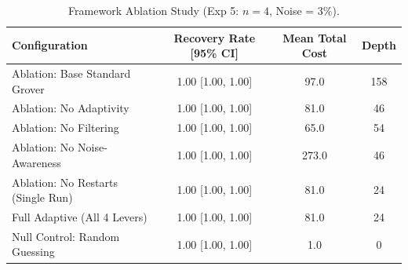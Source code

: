 \begin{table}[htbp]
\centering
\caption{Framework Ablation Study (Exp 5: $n=4$, Noise = 3\%).}
\label{tab:exp5_ablation}
\begin{tabular}{lccc}
\hline
\textbf{Configuration} & \textbf{Recovery Rate [95\% CI]} & \textbf{Mean Total Cost} & \textbf{Depth} \\
\hline
Ablation: Base Standard Grover & 1.00 [1.00, 1.00] & 97.0 & 158 \\
Ablation: No Adaptivity & 1.00 [1.00, 1.00] & 81.0 & 46 \\
Ablation: No Filtering & 1.00 [1.00, 1.00] & 65.0 & 54 \\
Ablation: No Noise-Awareness & 1.00 [1.00, 1.00] & 273.0 & 46 \\
Ablation: No Restarts (Single Run) & 1.00 [1.00, 1.00] & 81.0 & 24 \\
Full Adaptive (All 4 Levers) & 1.00 [1.00, 1.00] & 81.0 & 24 \\
Null Control: Random Guessing & 1.00 [1.00, 1.00] & 1.0 & 0 \\
\hline
\end{tabular}
\end{table}
